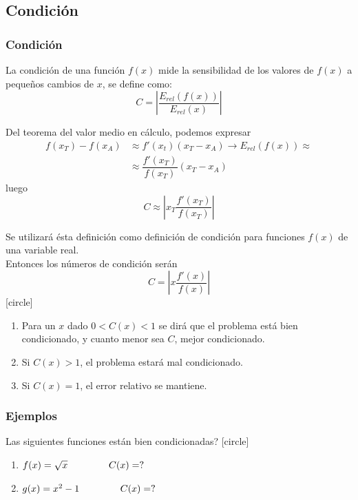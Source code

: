 \subsection{Condición}
\begin{frame}
\frametitle{Condición}
La condición de una función $f(x)$ mide la sensibilidad de los valores de $f(x)$ a pequeños
cambios de $x$, se define como:
\[ C = \left | \dfrac{E_{rel} (f(x))}{E_{rel}(x)} \right |  \]
\end{frame}
\begin{frame}
Del teorema del valor medio en cálculo, podemos expresar
\[ \begin{split} f(x_{T}) - f(x_{A}) & \approx f'(x_{t})(x_{T} - x_{A}) \rightarrow E_{rel}(f(x)) \approx \\ 
 & \approx \dfrac{f'(x_{T})}{f(x_{T})} (x_{T} - x_{A}) \end{split} \]
luego
\[ C \approx \left | x_{T} \dfrac{f'(x_{T})}{f(x_{T})} \right | \]
\end{frame}
\begin{frame}
Se utilizará ésta definición como definición de condición para funciones $f(x)$ de una variable real.
\\
\bigskip
Entonces los números de condición serán
\[ C = \left | x \dfrac{f'(x)}{f(x)} \right | \]
[circle]
\begin{enumerate}[<+->]
\item Para un $x$ dado $0 < C(x) < 1$ se dirá que el problema está bien condicionado, y cuanto menor sea $C$, mejor condicionado.
\item Si $C(x) > 1$, el problema estará mal condicionado.
\item Si $C(x) = 1$, el error relativo se mantiene.
\end{enumerate}
\end{frame}
\begin{frame}
\frametitle{Ejemplos}
 Las siguientes funciones están bien condicionadas?
[circle]
\begin{enumerate}
\item $f(x) = \sqrt{x} \hspace{1.5cm} C(x) = ?$
\item $g(x) = x^{2}-1 \hspace{1.5cm} C(x) = ?$
\end{enumerate}
\end{frame}
